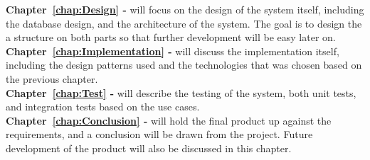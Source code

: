 \textbf{Chapter~\ref{chap:Design} - } will focus on the design of the system itself, including the database design, and the architecture of the system. The goal is to design the a structure on both parts so that further development will be easy later on.\\

\textbf{Chapter~\ref{chap:Implementation} - } will discuss the implementation itself, including the design patterns used and the technologies that was chosen based on the previous chapter.\\

\textbf{Chapter~\ref{chap:Test} - } will describe the testing of the system, both unit tests, and integration tests based on the use cases.\\

\textbf{Chapter~\ref{chap:Conclusion} - } will hold the final product up against the requirements, and a conclusion will be drawn from the project. Future development of the product will also be discussed in this chapter.
